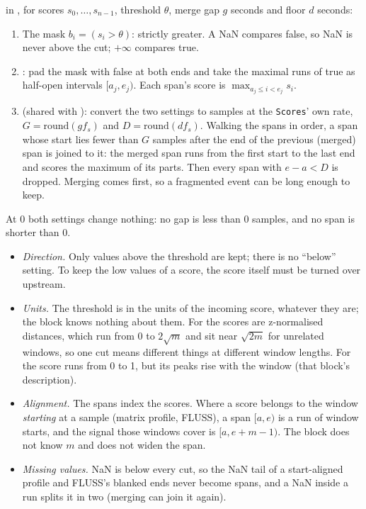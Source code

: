  in , for scores $s_0,\dots,s_{n-1}$, threshold
$\theta$, merge gap $g$ seconds and floor $d$ seconds:
\begin{enumerate}
\item The mask $b_i = (s_i > \theta)$: strictly greater. A NaN compares false, so NaN is never
  above the cut; $+\infty$ compares true.
\item {}: pad the mask with false at both ends and take the maximal runs of
  true as half-open intervals $[a_j, e_j)$. Each span's score is $\max_{a_j \le i < e_j} s_i$.
\item {} (shared with ): convert the two
  settings to samples at the \texttt{Scores}' own rate, $G = \mathrm{round}(g f_s)$ and
  $D = \mathrm{round}(d f_s)$. Walking the spans in order, a span whose start lies fewer than $G$
  samples after the end of the previous (merged) span is joined to it: the merged span runs from
  the first start to the last end and scores the maximum of its parts. Then every span with
  $e - a < D$ is dropped. Merging comes first, so a fragmented event can be long enough to keep.
\end{enumerate}
At 0 both settings change nothing: no gap is less than 0 samples, and no span is shorter than 0.

\begin{itemize}
\item \emph{Direction.} Only values above the threshold are kept; there is no ``below'' setting.
  To keep the low values of a score, the score itself must be turned over upstream.
\item \emph{Units.} The threshold is in the units of the incoming score, whatever they are; the
  block knows nothing about them. For  the scores are
  z-normalised distances, which run from 0 to $2\sqrt{m}$ and sit near $\sqrt{2m}$ for unrelated
  windows, so one cut means different things at different window lengths. For
   the score runs from 0 to 1, but its peaks rise with the window
  (that block's description).
\item \emph{Alignment.} The spans index the scores. Where a score belongs to the window
  \emph{starting} at a sample (matrix profile, FLUSS), a span $[a, e)$ is a run of window starts,
  and the signal those windows cover is $[a, e + m - 1)$. The block does not know $m$ and does not
  widen the span.
\item \emph{Missing values.} NaN is below every cut, so the NaN tail of a start-aligned profile and
  FLUSS's blanked ends never become spans, and a NaN inside a run splits it in two (merging can
  join it again).
\end{itemize}

